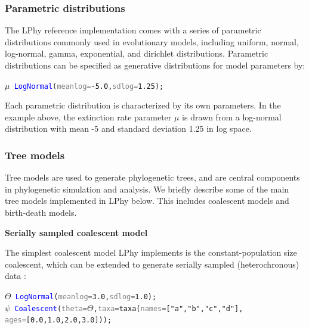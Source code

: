 \documentclass[10pt,letterpaper,table]{article}
\theoremstyle{definition}
\begin{document}
\subsubsection{Parametric distributions}
The LPhy reference implementation comes with a series of parametric distributions commonly used in evolutionary models, including uniform, normal, log-normal, gamma, exponential, and dirichlet distributions. 
Parametric distributions can be specified as generative distributions for model parameters by:

{\small
\begin{alltt}
    \textcolor{bluishgreen}{\(\mu\)} ~ \textcolor{blue}{LogNormal}(\textcolor{gray}{meanlog=}\textcolor{constant}{-5.0}, \textcolor{gray}{sdlog=}\textcolor{constant}{1.25});
\end{alltt}}

Each parametric distribution is characterized by its own parameters. 
In the example above, the extinction rate parameter $\mu$ is drawn from a log-normal distribution with mean -5 and standard deviation 1.25 in log space.

\subsubsection{Tree models}
\label{sec:treeprior}
Tree models are used to generate phylogenetic trees, and are central components in phylogenetic simulation and analysis. 
We briefly describe some of the main tree models implemented in LPhy below. 
This includes coalescent models and birth-death models.
\newline 

\textbf{Serially sampled coalescent model}

The simplest coalescent model LPhy implements is the constant-population size coalescent, which can be extended to generate serially sampled (heterochronous) data \cite{Rodrigo1999SerialCoalescent}:
{\small
  \begin{alltt}
    \textcolor{bluishgreen}{\(\Theta\)} ~ \textcolor{blue}{LogNormal}(\textcolor{gray}{meanlog=}\textcolor{constant}{3.0}, \textcolor{gray}{sdlog=}\textcolor{constant}{1.0});
    \textcolor{bluishgreen}{\(\psi\)} ~ \textcolor{blue}{Coalescent}(\textcolor{gray}{theta=}\textcolor{bluishgreen}{\(\Theta\)}, \textcolor{gray}{taxa=}\textcolor{generator}{taxa}(\textcolor{gray}{names=}[\textcolor{constant}{"a"}, \textcolor{constant}{"b"}, \textcolor{constant}{"c"}, \textcolor{constant}{"d"}], 
      \textcolor{gray}{ages=}[\textcolor{constant}{0.0}, \textcolor{constant}{1.0}, \textcolor{constant}{2.0}, \textcolor{constant}{3.0}]));
  \end{alltt}
}
\end{document}
